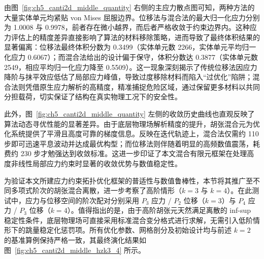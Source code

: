 由图~\ref{fig:ch5_canti2d_middle_quantity} 右侧的主应力散点图可知，两种方法的大量实体单元均紧贴 von Mises 屈服边界。位移法与混合法的最大归一化应力分别为 1.0008 与 0.9978，前者存在微小越界，而后者严格收敛于约束边界内。这种应力评估上的精度差异直接影响了算法的材料移除策略，进而导致了最终体积结果的显著偏离：位移法最终体积分数为 0.3499（实体单元数 2266，实体单元平均归一化应力 0.6067）；而混合法给出的设计偏于保守，体积分数达 0.3877（实体单元数 2549，相应平均归一化应力降至 0.5509）。这一现象深刻揭示了传统位移法因应力降阶与抹平效应低估了局部应力峰值，导致过度移除材料而陷入“过优化”陷阱；混合法则凭借原生应力解析的高精度，精准捕捉危险区域，通过保留更多材料以共同分担载荷，切实保证了结构在真实物理工况下的安全性。

此外，图~\ref{fig:ch5_canti2d_middle_quantity} 左侧的收敛历史曲线也直观反映了算法动态寻优性能的显著差异。由于底层物理场解析精度的提升，胡张混合元为优化系统提供了平滑且高度可靠的梯度信息。反映在迭代轨迹上，混合法仅需约 110 步即可迅速平息波动并达成最优构型；而位移法则伴随着明显的高频数值震荡，耗费约 230 步才勉强达到收敛标准。这进一步印证了本文混合有限元框架在处理高度非线性局部应力约束时显著的收敛优势与数值稳定性。

为验证本文所建应力约束拓扑优化框架的普适性与数值鲁棒性，本节将其推广至不同多项式阶次的胡张混合离散，进一步考察了高阶情形（$k=3$ 与 $k=4$）。在此测试中，应力与位移空间的阶次配对分别采用 $P_3$ 应力 / $P_2$ 位移（$k=3$）与 $P_4$ 应力 / $P_3$ 位移（$k=4$）。值得指出的是，由于高阶胡张元天然满足离散的 inf-sup 稳定性条件，底层物理场可直接采用标准混合变分格式进行求解，无需引入低阶情形下的跳量稳定化惩罚项。所有优化参数、网格剖分及初始设计均与前述 $k=2$ 的基准算例保持严格一致，其最终演化结果如图~\ref{fig:ch5_canti2d_middle_hzk3_4} 所示。


